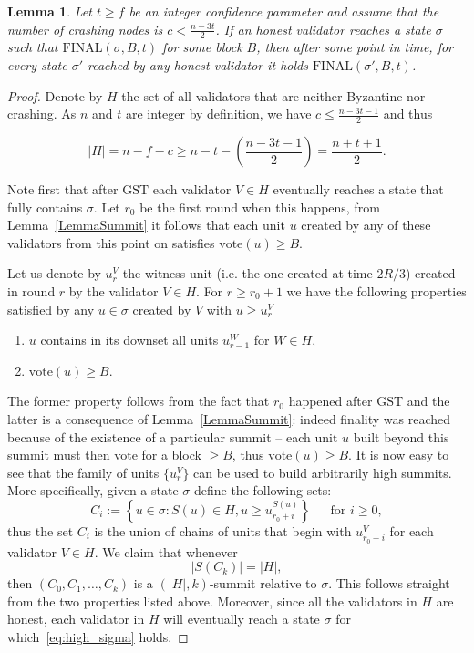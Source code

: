\documentclass[12pt, fleqn]{article}
\newtheorem{lemma}{Lemma}
\newcommand{\vote}{\mathrm{vote}}
\newcommand{\final}{\mathrm{FINAL}}
\newcommand{\gst}{\mathrm{GST}}
\newcommand{\inparen}[1]{\left(#1\right)}
\newcommand{\inbraces}[1]{\left\{#1\right\}}
\begin{document}
\begin{lemma}\label{lemma:final_follow}
Let $t\geq f$ be an integer confidence parameter and assume that the number of crashing nodes is $c< \frac{n-3t}{2}$. If an honest validator reaches a state $\sigma$ such that $\final(\sigma, B, t)$ for some block $B$, then after some point in time, for every state $\sigma'$ reached by any honest validator it holds $\final(\sigma', B, t)$.
\end{lemma}

\begin{proof}
Denote by $H$ the set of all validators that are neither Byzantine nor crashing. As $n$ and $t$ are integer by definition, we have $c\leq \frac{n-3t-1}{2}$ and thus
%

\begin{equation}\label{eq:size_H}
 |H|=n-f-c\geq n-t-\inparen{\frac{n-3t-1}{2}} =  \frac{n+t+1}{2}.
\end{equation}

%
Note first that after $\gst$ each validator $V\in H$ eventually reaches a state that fully contains $\sigma$.
%
Let $r_0$ be the first round when this happens, from Lemma~\ref{LemmaSummit} it follows that each unit $u$ created by any of these validators from this point on satisfies $\vote(u) \geq B$.
%

Let us denote by $u^V_r$ the witness unit (i.e. the one created at time $2R/3$) created in round $r$ by the validator $V\in H$.
%
For $r\geq r_0+1$ we have the following properties satisfied by any $u\in \sigma$ created by $V$ with $u\geq u_{r}^V$
\begin{enumerate}
    \item $u$ contains in its downset all units $u^W_{r-1}$ for $W\in H$,
    \item $\vote(u) \geq B$.
\end{enumerate}
The former property follows from the fact that $r_0$ happened after $\gst$ and the latter is a consequence of Lemma~\ref{LemmaSummit}: indeed finality was reached because of the existence of a particular summit -- each unit $u$ built beyond this summit must then vote for a block  $\geq B$, thus $\vote(u)\geq B$.
%
It is now easy to see that the family of units $\{u_r^V\}$ can be used to build arbitrarily high summits.
%
More specifically, given a state $\sigma$ define the following sets:
$$C_i:= \inbraces{u \in \sigma: S(u)\in H, u\geq u_{r_0+i}^{S(u)}} ~~~~~~~\mbox{for }i\geq 0,$$
thus the set $C_i$ is the union of chains of units that begin with $u_{r_0+i}^V$ for each validator $V\in H$.
%
We claim that whenever 
\begin{equation}\label{eq:high_sigma}
    |S(C_k)|=|H|,
\end{equation} then $(C_0, C_1, \ldots, C_k)$ is a $(|H|, k)$-summit relative to $\sigma$.
%
This follows straight from the two properties listed above.
%
Moreover, since all the validators in $H$ are honest, each validator in $H$ will eventually reach a state $\sigma$ for which~\eqref{eq:high_sigma} holds.


\end{proof}
\end{document}
